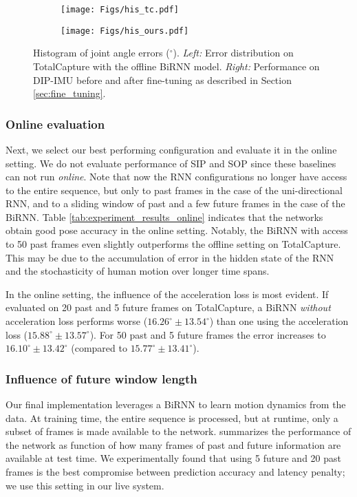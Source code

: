 \documentclass[acmtog]{acmart}
\begin{document}
\begin{figure}[t]
	\begin{subfigure}[b]{0.23\textwidth}
		\texttt{[image: Figs/his\_tc.pdf]}
	\end{subfigure}
	\begin{subfigure}[b]{0.23\textwidth}
		\texttt{[image: Figs/his\_ours.pdf]}
	\end{subfigure}
\caption{Histogram of joint angle errors ($^\circ$). \emph{Left:} Error distribution on TotalCapture with the offline BiRNN model. \emph{Right:} Performance on DIP-IMU before and after fine-tuning as described in Section \ref{sec:fine_tuning}.}
\label{fig:his}
\end{figure}\subsubsection{Online evaluation}
Next, we select our best performing configuration and evaluate it in the online setting. We do not evaluate performance of SIP and SOP since these baselines can not run \emph{online}. Note that now the RNN configurations no longer have access to the entire sequence, but only to past frames in the case of the uni-directional RNN, and to a sliding window of past and a few future frames in the case of the BiRNN. Table \ref{tab:experiment_results_online} indicates that the networks obtain good pose  accuracy in the online setting. Notably, the BiRNN with access to 50 past frames even slightly outperforms the offline setting on TotalCapture. This may be due to the accumulation of error in the hidden state of the RNN and the stochasticity of human motion over longer time spans.

In the online setting, the influence of the acceleration loss is most evident. If evaluated on 20 past and 5 future frames on TotalCapture, a BiRNN \emph{without} acceleration loss performs worse ($16.26^\circ \pm 13.54^\circ$) than one using the acceleration loss ($15.88^\circ \pm 13.57^\circ$). For 50 past and 5 future frames the error increases to $16.10^\circ \pm 13.42^\circ$ (compared to $15.77^\circ \pm 13.41^\circ$).

\subsubsection{Influence of future window length}
Our final implementation leverages a BiRNN to learn motion dynamics from the data. At training time, the entire sequence is processed, but at runtime, only a subset of frames is made available to the network.  summarizes the performance of the network as function of how many frames of past and future information are available at test time. We experimentally found that using 5 future and 20 past frames is the best compromise between prediction accuracy and latency penalty; we use this setting in our live system. 
\end{document}
